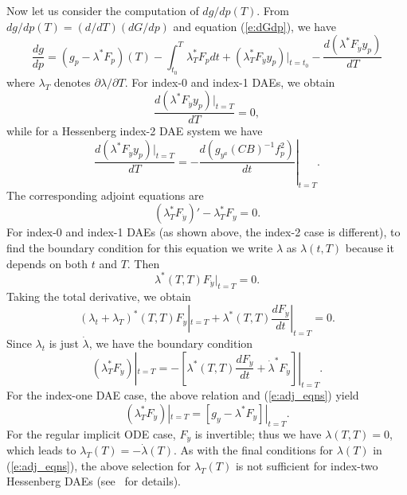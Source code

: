 Now let us consider the computation of ${dg}/{dp}(T)$.
From ${dg}/{dp}(T) = ({d}/{dT})({dG}/{dp})$ and equation (\ref{e:dGdp}), we have
\begin{equation}\label{e:dgdp1}
  \frac{dg}{dp} = (g_p - \lambda^*F_p)(T) - \int_{t_0}^T \lambda^*_TF_p dt +
  (\lambda^*_T F_{\dot{y}}y_p)|_{t=t_0} - \frac{d(\lambda^*F_{\dot y}y_p)}{dT}
\end{equation}
where $\lambda_T$ denotes ${\partial \lambda}/{\partial T}$.
For index-0 and index-1 DAEs, we obtain
$$
\frac{d(\lambda^*F_{\dot y}y_p)|_{t=T}}{dT} = 0 ,
$$
while for a Hessenberg index-2 DAE system we have
$$
\frac{d(\lambda^*F_{\dot y}y_p)|_{t=T}}{dT} =
-\left.\frac{d(g_{y^a}(CB)^{-1}f^2_p)}{dt}\right|_{t=T} .
$$
The corresponding adjoint equations are
\begin{equation} \label{e:adj1_eqns}
  (\lambda^*_TF_{\dot y})'  - \lambda^*_T F_y = 0.
\end{equation}
For index-0 and index-1 DAEs (as shown above, the index-2 case is
different), to find the boundary condition for this equation we write
$\lambda$ as $\lambda(t, T)$ because it depends on both $t$ and $T$.  Then
$$
\lambda^*(T, T) F_{\dot{y}}|_{t=T}  = 0.
$$
Taking the total derivative, we obtain
$$
(\lambda_t + \lambda_T)^*(T, T) F_{\dot{y}}|_{t=T}  +
\lambda^*(T,T)\frac{dF_{\dot{y}}}{dt}|_{t=T} = 0.
$$
Since $\lambda_t$ is just $\dot \lambda$, we have the boundary condition
\begin{equation*}
  (\lambda_T^* F_{\dot{y}} )|_{t=T}  = -
  \left[
    \lambda^*(T,T)\frac{dF_{\dot{y}}}{dt} +
    \dot{\lambda}^* F_{\dot{y}}
  \right] |_{t=T}.
\end{equation*}
For the index-one DAE case, the above relation and (\ref{e:adj_eqns}) yield
\begin{equation}
  (\lambda_T^* F_{\dot{y}} )|_{t=T} = \left[g_y - \lambda^*F_y\right]|_{t=T}.
\end{equation}
For the regular implicit ODE case, $F_{\dot{y}}$ is invertible; thus we have
$\lambda(T, T) = 0$, which leads to $\lambda_T(T) = - \dot{\lambda}(T)$.
As with the final conditions for $\lambda(T)$ in (\ref{e:adj_eqns}), the above selection
for $\lambda_T(T)$ is not sufficient for index-two Hessenberg DAEs (see~\cite{CLPS:03} for details).


